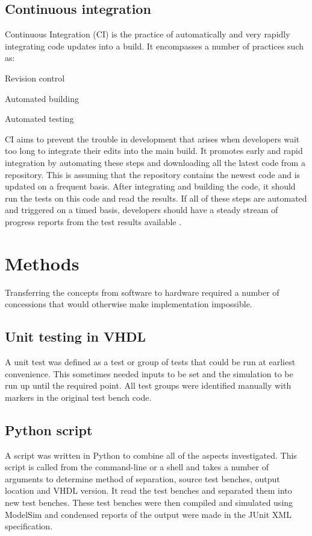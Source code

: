 \documentclass[twoside]{article}
\begin{document}
\begin{multicols}{2}
\subsection{Continuous integration}
Continuous Integration (CI) is the practice of automatically and very rapidly integrating code updates into a build. It encompasses a number of practices such as:
\begin{compactitem}
\item Revision control
\item Automated building
\item Automated testing
\end{compactitem}
CI aims to prevent the trouble in development that arises when developers wait too long to integrate their edits into the main build. It promotes early and rapid integration by automating these steps and downloading all the latest code from a repository. This is assuming that the repository contains the newest code and is updated on a frequent basis. After integrating and building the code, it should run the tests on this code and read the results. If all of these steps are automated and triggered on a timed basis, developers should have a steady stream of progress reports from the test results available \cite{ci1,ci3}.


\section{Methods}
Transferring the concepts from software to hardware required a number of concessions that would otherwise make implementation impossible.

\subsection{Unit testing in VHDL}
A unit test was defined as a test or group of tests that could be run at earliest convenience. This sometimes needed inputs to be set and the simulation to be run up until the required point. All test groups were identified manually with markers in the original test bench code.

\subsection{Python script}
A script was written in Python to combine all of the aspects investigated. This script is called from the command-line or a shell and takes a number of arguments to determine method of separation, source test benches, output location and VHDL version. It read the test benches and separated them into new test benches. These test benches were then compiled and simulated using ModelSim and condensed reports of the output were made in the JUnit XML specification.


\end{multicols}
\end{document}
